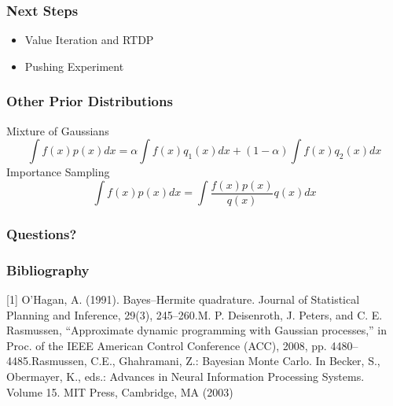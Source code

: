 \documentclass[11pt]{beamer}
\begin{document}
\begin{frame}
\frametitle{Next Steps}
\begin{itemize}
	\item Value Iteration and RTDP
	\item Pushing Experiment
\end{itemize}
\end{frame}

 \begin{frame}
\frametitle{Other Prior Distributions}
Mixture of Gaussians
\begin{equation*}
\int f(x) p(x) dx = \alpha \int f(x) q_{1}(x) dx + (1 - \alpha) \int f(x) q_{2}(x) dx
\end{equation*}
\newline
Importance Sampling
\begin{equation*}
\int f(x) p(x) dx = \int \frac{f(x) p(x)}{q(x)} q(x) dx
\end{equation*}
\end{frame}

\begin{frame}
\frametitle{Questions?}
\end{frame}

\begin{frame}
\frametitle{Bibliography}
[1] O’Hagan, A. (1991). Bayes–Hermite quadrature. Journal of Statistical Planning and Inference, 29(3), 245–260.\newline
[2]   M.  P.  Deisenroth,  J.  Peters,  and  C.  E.  Rasmussen,  “Approximate dynamic programming with Gaussian processes,” in Proc. of the IEEE American Control Conference (ACC), 2008, pp. 4480–4485.\newline
[3] Rasmussen, C.E., Ghahramani, Z.: Bayesian Monte Carlo. In Becker, S., Obermayer, K., eds.: Advances in Neural Information Processing Systems. Volume 15. MIT Press, Cambridge, MA (2003)
\end{frame}

 
\end{document}
